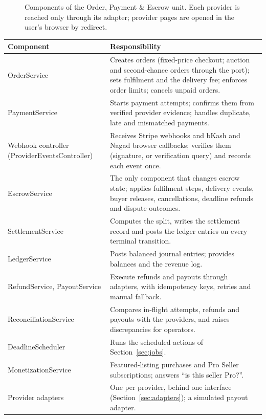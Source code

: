\documentclass[11pt,a4paper]{article}
\newenvironment{dtable}[1]{\small\begin{longtable}{#1}}{\end{longtable}}
\begin{document}
\begin{figure}[!htbp]
{}
\caption{Components of the Order, Payment \& Escrow unit. Each provider is reached only through its adapter; provider pages are opened in the user's browser by redirect.}
\label{fig:components}
\end{figure}

\begin{dtable}{@{}>{\raggedright\arraybackslash}p{3.6cm}>{\raggedright\arraybackslash}p{11.6cm}@{}}
\toprule
\textbf{Component} & \textbf{Responsibility} \\ \midrule \endhead
OrderService & Creates orders (fixed-price checkout; auction and second-chance orders through the port); sets fulfilment and the delivery fee; enforces order limits; cancels unpaid orders. \\
PaymentService & Starts payment attempts; confirms them from verified provider evidence; handles duplicate, late and mismatched payments. \\
Webhook controller (ProviderEventsController) & Receives Stripe webhooks and bKash and Nagad browser callbacks; verifies them (signature, or verification query) and records each event once. \\
EscrowService & The only component that changes escrow state; applies fulfilment steps, delivery events, buyer releases, cancellations, deadline refunds and dispute outcomes. \\
SettlementService & Computes the split, writes the settlement record and posts the ledger entries on every terminal transition. \\
LedgerService & Posts balanced journal entries; provides balances and the revenue log. \\
RefundService, PayoutService & Execute refunds and payouts through adapters, with idempotency keys, retries and manual fallback. \\
ReconciliationService & Compares in-flight attempts, refunds and payouts with the providers, and raises discrepancies for operators. \\
DeadlineScheduler & Runs the scheduled actions of Section~\ref{sec:jobs}. \\
MonetizationService & Featured-listing purchases and Pro Seller subscriptions; answers ``is this seller Pro?''. \\
Provider adapters & One per provider, behind one interface (Section~\ref{sec:adapters}); a simulated payout adapter. \\
\bottomrule
\end{dtable}
\end{document}
